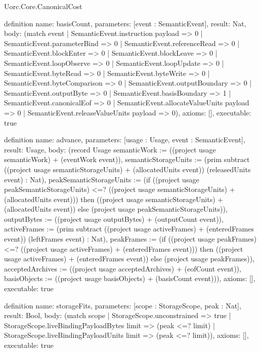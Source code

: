 \begin{lexlean}{Uorc.Core.CanonicalCost}
\begin{semanticmodule}
definition{
  name: basisCount,
  parameters: [event : SemanticEvent],
  result: Nat,
  body: (match event
    | SemanticEvent.instruction payload => 0
    | SemanticEvent.parameterBind => 0
    | SemanticEvent.referenceRead => 0
    | SemanticEvent.blockEnter => 0
    | SemanticEvent.blockLeave => 0
    | SemanticEvent.loopObserve => 0
    | SemanticEvent.loopUpdate => 0
    | SemanticEvent.byteRead => 0
    | SemanticEvent.byteWrite => 0
    | SemanticEvent.byteComparison => 0
    | SemanticEvent.outputBoundary => 0
    | SemanticEvent.outputByte => 0
    | SemanticEvent.basisBoundary => 1
    | SemanticEvent.canonicalEof => 0
    | SemanticEvent.allocateValueUnits payload => 0
    | SemanticEvent.releaseValueUnits payload => 0),
  axioms: [],
  executable: true
}

definition{
  name: advance,
  parameters: [usage : Usage, event : SemanticEvent],
  result: Usage,
  body: (record Usage {semanticWork := ((project usage semanticWork) + (eventWork event)), semanticStorageUnits := (prim subtract ((project usage semanticStorageUnits) + (allocatedUnits event)) (releasedUnits event) : Nat), peakSemanticStorageUnits := (if ((project usage peakSemanticStorageUnits) <=? ((project usage semanticStorageUnits) + (allocatedUnits event))) then ((project usage semanticStorageUnits) + (allocatedUnits event)) else (project usage peakSemanticStorageUnits)), outputBytes := ((project usage outputBytes) + (outputCount event)), activeFrames := (prim subtract ((project usage activeFrames) + (enteredFrames event)) (leftFrames event) : Nat), peakFrames := (if ((project usage peakFrames) <=? ((project usage activeFrames) + (enteredFrames event))) then ((project usage activeFrames) + (enteredFrames event)) else (project usage peakFrames)), acceptedArchives := ((project usage acceptedArchives) + (eofCount event)), basisObjects := ((project usage basisObjects) + (basisCount event))}),
  axioms: [],
  executable: true
}

definition{
  name: storageFits,
  parameters: [scope : StorageScope, peak : Nat],
  result: Bool,
  body: (match scope
    | StorageScope.unconstrained => true
    | StorageScope.liveBindingPayloadBytes limit => (peak <=? limit)
    | StorageScope.liveBindingPayloadUnits limit => (peak <=? limit)),
  axioms: [],
  executable: true
}


\end{semanticmodule}
\end{lexlean}
